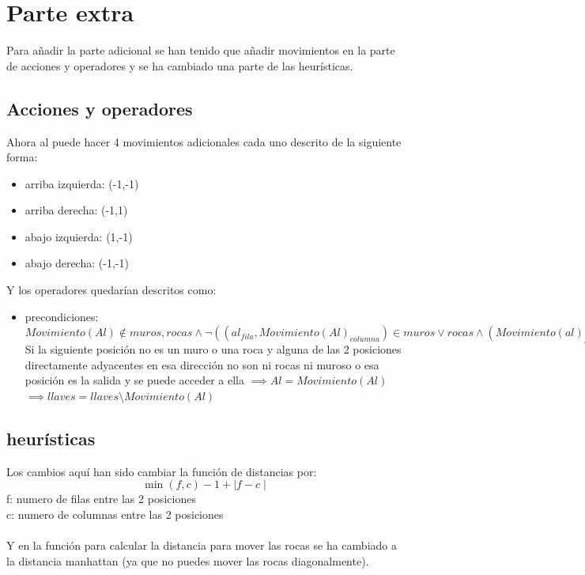 \documentclass[11pt,spanish]{article}
\begin{document}
	\section{Parte extra}
	Para añadir la parte adicional se han tenido que añadir movimientos en la parte de acciones y operadores y se ha cambiado una parte de las heurísticas.
		\subsection{Acciones y operadores}
			Ahora al puede hacer 4 movimientos adicionales cada uno descrito de la siguiente forma:
			\begin{itemize}
				\item arriba izquierda: (-1,-1)
				\item arriba derecha: (-1,1)
				\item abajo izquierda: (1,-1)
				\item abajo derecha: (-1,-1)
			\end{itemize}
			Y los operadores quedarían descritos como:
			\begin{itemize}
				\item precondiciones: $Movimiento(Al) \notin muros, rocas \land \neg((al_{fila},Movimiento(Al)_{columna}) \in muros \lor rocas  \land (Movimiento(al)_{fila},Al_{columna}) \in muros \lor rocas)\lor (llaves = \emptyset \land Movimiento(Al) = salida)$\\Si la siguiente posición no es un muro o una roca y alguna de las 2 posiciones directamente adyacentes en esa dirección no son ni rocas ni muroso o  esa posición es la salida y se puede acceder a ella
				$\implies Al = Movimiento(Al)$\\
				$\implies llaves = llaves\setminus Movimiento(Al)$
			\end{itemize}
		\subsection{heurísticas}
			Los cambios aquí han sido cambiar la función de distancias por:\\
			$$\min(f,c)-1 + \mid f-c\mid$$
			f: numero de filas entre las 2 posiciones\\
			c: numero de columnas entre las 2 posiciones\\
			\\
			Y en la función para calcular la distancia para mover las rocas se ha cambiado a la distancia manhattan (ya que no puedes mover las rocas diagonalmente).\\
\end{document}
